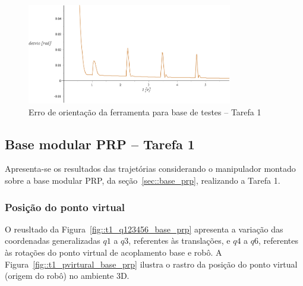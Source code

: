 \begin{figure}[h!]
	\centering 
 	\includegraphics[width=0.80\textwidth]{figs/t1_erroori_base_testes}
 	\caption{Erro de orientação da ferramenta para base de testes -- Tarefa
 	1}
 	\label{fig::t1_erroori_base_testes}
\end{figure}



\subsection{Base modular PRP -- Tarefa 1} \label{sec::res_prp}

Apresenta-se os resultados das trajetórias considerando o manipulador montado
sobre a base modular PRP, da seção~\ref{sec::base_prp}, realizando a Tarefa 1.

\subsubsection{Posição do ponto virtual}

O reusltado da Figura~\ref{fig::t1_q123456_base_prp} apresenta a variação das
coordenadas generalizadas $q1$ a $q3$, referentes às translações, e $q4$ a $q6$,
referentes às rotações do ponto virtual de acoplamento base e robô. A
Figura~\ref{fig::t1_pvirtural_base_prp} ilustra o rastro da posição do ponto
virtual (origem do robô) no ambiente 3D.

